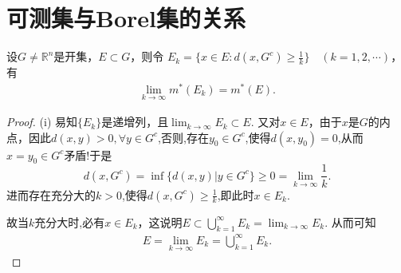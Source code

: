 \documentclass[../../main.tex]{subfiles}%
\begin{document}
\section{可测集与Borel集的关系}

\begin{lemma}[Carathéodory引理]\label{lemma:卡拉西奥多里引理}
设$G\neq\mathbb{R}^n$是开集，$E\subset G$，则令
$E_k = \{x\in E:d(x,G^c)\geqslant \frac{1}{k}\}\quad (k = 1,2,\cdots)$，
有
\begin{align*}
\lim_{k\to\infty}m^*(E_k)=m^*(E).
\end{align*}
\end{lemma}
\begin{proof}

(i) 易知$\{E_k\}$是递增列，且$\lim_{k\to\infty}E_k\subset E$. 又对$x\in E$，由于$x$是$G$的内点，因此$d(x,y)>0,\forall y\in G^c$,否则,存在$y_0\in G^c$,使得$d(x,y_0)=0$,从而$x=y_0\in G^c$矛盾!于是$$d(x,G^c)=\inf\{d(x,y)|y\in G^c\} \geqslant  0=\lim_{k\to \infty}\frac{1}{k}.$$
进而存在充分大的$k>0$,使得$d(x,G^c)\geqslant \frac{1}{k}$,即此时$x\in E_k$.

故当$k$充分大时,必有$x\in E_k$，这说明$E\subset\bigcup_{k = 1}^{\infty}E_k=\lim_{k\to\infty}E_k$. 从而可知
\begin{align*}
E=\lim_{k\to\infty}E_k=\bigcup_{k = 1}^{\infty}E_k.
\end{align*}


\end{proof}
\end{document}

